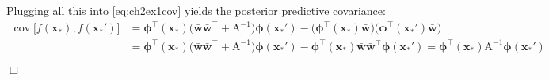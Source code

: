 \documentclass[11pt, a4paper]{scrartcl}
\DeclareMathOperator{\cov}{cov}
\newcommand{\transposed}{{\!\top\!}}
\renewcommand{\vec}[1]{\bm{#1}}
\newcommand{\mat}[1]{\bm{\mathrm{#1}}}
\newcommand{\qed}{\hfill\(\Box\)}
\begin{document}
			Plugging all this into \eqref{eq:ch2ex1cov} yields the posterior predictive covariance:
			\begin{align}
				\cov\!\big[ f(\vec{x}_\ast), f(\vec{x}_\ast') \big]
					&= \vec{\phi}^\transposed(\vec{x}_\ast) \big( \bar{\vec{w}} \bar{\vec{w}}^\transposed + \mat{A}^{-1} \big) \vec{\phi}(\vec{x}_\ast') - \big( \vec{\phi}^\transposed(\vec{x}_\ast) \bar{\vec{w}} \big) \big( \vec{\phi}^\transposed(\vec{x}_\ast') \bar{\vec{w}} \big) \\
					&= \vec{\phi}^\transposed(\vec{x}_\ast) \big( \bar{\vec{w}} \bar{\vec{w}}^\transposed + \mat{A}^{-1} \big) \vec{\phi}(\vec{x}_\ast') - \vec{\phi}^\transposed(\vec{x}_\ast) \bar{\vec{w}} \bar{\vec{w}}^\transposed \vec{\phi}(\vec{x}_\ast')
					= \vec{\phi}^\transposed(\vec{x}_\ast) \mat{A}^{-1} \vec{\phi}(\vec{x}_\ast')
			\end{align}

			\qed
\end{document}
